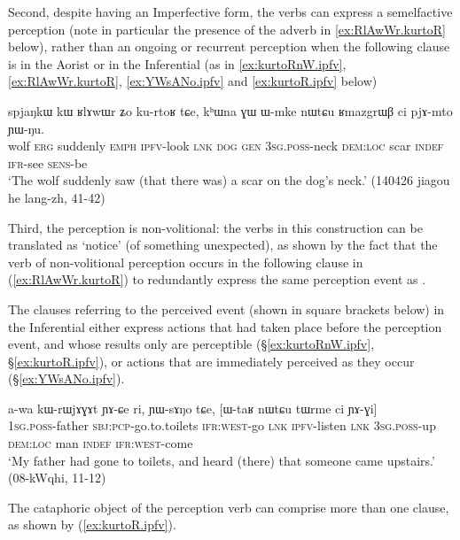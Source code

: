 Second, despite having an Imperfective form, the verbs can express a semelfactive perception (note in particular the presence of the adverb  in \ref{ex:RlAwWr.kurtoR} below), rather than an ongoing or recurrent perception when the following clause is in the Aorist or in the Inferential (as in \ref{ex:kurtoRnW.ipfv}, \ref{ex:RlAwWr.kurtoR}, \ref{ex:YWsANo.ipfv} and \ref{ex:kurtoR.ipfv} below)  

\begin{exe}
\ex \label{ex:RlAwWr.kurtoR}
\gll spjaŋkɯ kɯ ʁlɤwɯr ʑo ku-rtoʁ tɕe, kʰɯna ɣɯ ɯ-mke nɯtɕu ʁmazgrɯβ ci pjɤ-mto ɲɯ-ŋu.  \\
wolf \textsc{erg} suddenly \textsc{emph} \textsc{ipfv}-look \textsc{lnk} \textsc{dog} \textsc{gen} \textsc{3sg}.\textsc{poss}-neck \textsc{dem}:\textsc{loc} scar \textsc{indef} \textsc{ifr}-see \textsc{sens}-be \\
\glt `The wolf suddenly saw (that there was) a scar on the dog's neck.' (140426 jiagou he lang-zh, 41-42)
\end{exe}

Third, the perception is non-volitional: the verbs in this construction can be translated as `notice' (of something unexpected), as shown by the fact that the verb of non-volitional perception  occurs in the following clause in (\ref{ex:RlAwWr.kurtoR}) to redundantly express the same perception event as . 

 The clauses referring to the perceived event (shown in square brackets below) in the Inferential either express actions that had taken place before the perception event, and whose results only are perceptible (§\ref{ex:kurtoRnW.ipfv}, §\ref{ex:kurtoR.ipfv}), or actions that are immediately perceived as they occur (§\ref{ex:YWsANo.ipfv}).


\begin{exe}
\ex \label{ex:YWsANo.ipfv}
\gll a-wa kɯ-rɯjɤɣɤt ɲɤ-ɕe ri, ɲɯ-sɤŋo tɕe, [ɯ-taʁ nɯtɕu tɯrme ci ɲɤ-ɣi]  \\
\textsc{1sg}.\textsc{poss}-father \textsc{sbj}:\textsc{pcp}-go.to.toilets \textsc{ifr}:\textsc{west}-go \textsc{lnk} \textsc{ipfv}-listen \textsc{lnk} \textsc{3sg}.\textsc{poss}-up \textsc{dem}:\textsc{loc} man \textsc{indef} \textsc{ifr}:\textsc{west}-come \\
\glt `My father had gone to toilets, and heard (there) that someone came upstairs.' (08-kWqhi, 11-12)
\end{exe}

The cataphoric object of the perception verb can comprise more than one clause, as shown by (\ref{ex:kurtoR.ipfv}).

